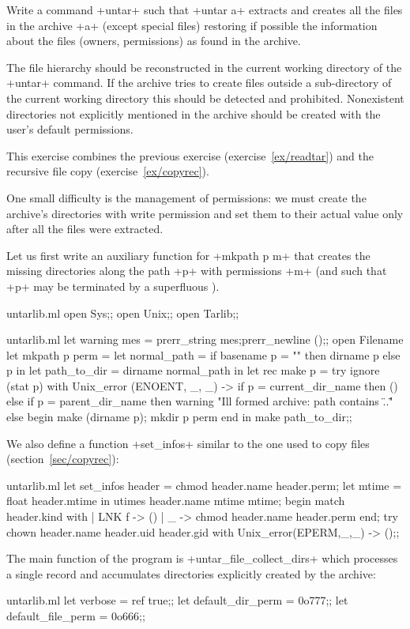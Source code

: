 \begin{exercise}\label{ex/untar}
Write a command \ml+untar+ such that \ml+untar a+ extracts and creates 
all the files in the archive  \ml+a+ (except special files) 
restoring if possible the information about the files
(owners, permissions) as found in the archive.

The file hierarchy should be reconstructed in the current working
directory of the \ml+untar+ command. If the archive tries to create
files outside a sub-directory of the current working directory this
should be detected and prohibited. Nonexistent directories not explicitly
mentioned in the archive should be created with the user's default
permissions.
\end{exercise}

\begin{answer}
This exercise combines the previous exercise (exercise~\ref {ex/readtar})
and the recursive file copy (exercise~\ref {ex/copyrec}).

One small difficulty is the management of permissions: we must create
the archive's directories with write permission and set them to their
actual value only after all the files were extracted.

Let us first write an auxiliary function for \ml+mkpath p m+ that
creates the missing directories along the path \ml+p+ with permissions
\ml+m+ (and such that \ml+p+ may be terminated by a
superfluous \quotes{\ml+/+}).
%
\begin{codefile}{untarlib.ml}
open Sys;;
open Unix;;
open Tarlib;;
\end{codefile}
%
\begin{listingcodefile}{untarlib.ml}
let warning mes = prerr_string mes;prerr_newline ();;
open Filename
let mkpath p perm =
  let normal_path =
    if basename p = "" then dirname p else p in
  let path_to_dir = dirname normal_path in 
  let rec make p = 
    try ignore (stat p)
    with Unix_error (ENOENT, _, _) ->
      if p = current_dir_name then ()
      else if p = parent_dir_name then 
        warning "Ill formed archive: path contains \"..\""
      else begin
        make (dirname p);
        mkdir p perm
      end in
  make path_to_dir;;
\end{listingcodefile}
%
We also define a function \ml+set_infos+ similar to the one
used to copy files (section~\ref {sec/copyrec}):
%
\begin{listingcodefile}{untarlib.ml}
let set_infos header =
  chmod header.name header.perm;
  let mtime = float header.mtime in
  utimes header.name mtime mtime;
  begin match header.kind with
  | LNK f -> ()
  | _ ->  chmod header.name header.perm
  end;
  try chown header.name  header.uid header.gid
  with Unix_error(EPERM,_,_) -> ();;
\end{listingcodefile}
%
The main function of the program is \ml+untar_file_collect_dirs+ which 
processes a single record and accumulates directories explicitly
created by the archive:
%
\begin{listingcodefile}{untarlib.ml}
let verbose = ref true;;
let default_dir_perm = 0o777;;
let default_file_perm = 0o666;;


\end{listingcodefile}
\end{answer}
